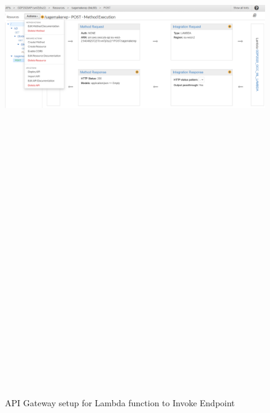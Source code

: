 \begin{figure} [ht]
    \centering
    \includegraphics[width=14.6cm,height=200.0cm,keepaspectratio]{pages/Chapter4/Chapter 4 Images/API Gateway.PNG}
    \caption{API Gateway setup for Lambda function to Invoke Endpoint}
    \label{fig_api}
\end{figure}


  
